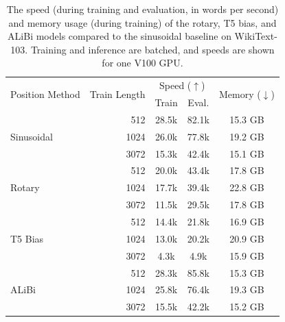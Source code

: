 \begin{table}[h]

\caption{ The speed (during training and evaluation, in words per second) and memory usage (during training) of the rotary, T5 bias, and ALiBi models compared to the sinusoidal baseline  on WikiText-103. Training and inference are batched, and speeds are shown for one V100 GPU. }
\label{tab:baselines_speed_mem}
\begin{center}
\begin{tabular}{@{}lrccc@{}}
\toprule
\multirow{2}{*}[0pt]{Position Method}& \multirow{2}{*}[0pt]{Train Length}&  \multicolumn{2}{c}{Speed ($\uparrow$)} & \multirow{2}{*}[0pt]{Memory ($\downarrow$)} \\
                &  & Train  & Eval. &   \\\midrule
                








& 512           &28.5k &82.1k  & 15.3 GB  \\
Sinusoidal&1024 &26.0k &77.8k  & 19.2 GB  \\
& 3072          &15.3k &42.4k  & 15.1 GB \\\midrule
&512            &20.0k &43.4k  & 17.8 GB  \\
Rotary & 1024   &17.7k &39.4k  & 22.8 GB  \\
& 3072          &11.5k &29.5k  & 17.8 GB  \\\midrule
& 512           &14.4k &21.8k  & 16.9 GB  \\
T5 Bias& 1024   &13.0k &20.2k  & 20.9 GB  \\
& 3072          & 4.3k & 4.9k  & 15.9 GB  \\\midrule
& 512           &28.3k &85.8k  & 15.3 GB \\
ALiBi & 1024    &25.8k &76.4k  & 19.3 GB \\
& 3072          &15.5k &42.2k  & 15.2 GB \\

\bottomrule
\end{tabular}
\end{center}
\end{table}


